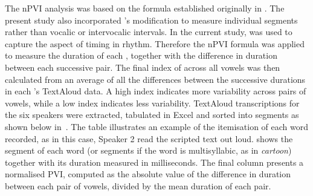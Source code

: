 \documentclass[output=paper]{langsci/langscibook}
\begin{document}
The nPVI analysis was based on the formula established originally in \citet{GrabeLow2002}. The present study also incorporated \citet{NokesHay2012}'s modification to measure individual segments rather than vocalic or intervocalic intervals. In the current study,  was used to capture the aspect of timing in rhythm. Therefore the nPVI formula was applied to measure the duration of each , together with the difference in duration between each successive  pair. The final index of  across all vowels was then calculated from an average of all the differences between the successive  durations in each 's TextAloud data. A high index indicates more variability across pairs of vowels, while a low index indicates less variability. TextAloud transcriptions for the six speakers were extracted, tabulated in Excel and sorted into  segments as shown below in~. The table illustrates an example of the itemisation of each word recorded, as in this case, Speaker 2 read the scripted text out loud.  shows the  segment of each word (or segments if the word is multisyllabic, as in \textit{cartoon}) together with its duration measured in milliseconds. The final column presents a normalised PVI, computed as the absolute value of the difference in duration between each pair of vowels, divided by the mean duration of each pair. 

\end{document}
